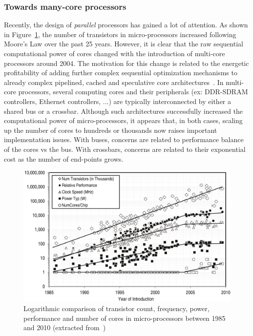 \documentclass[main.tex]{subfiles}
\begin{document}
\subsubsection{Towards many-core processors}
Recently, the design of \emph{parallel} processors has gained a lot of
attention. As shown in Figure~\ref{fig_intro_procPerfScaling}, the number of
transistors in micro-processors increased following Moore's Law over the past
25 years. However, it is clear that the raw sequential computational power of
cores changed with the introduction of multi-core processors around 2004. The
motivation for this change is related to the energetic profitability of adding
further complex sequential optimization mechanisms to already complex
pipelined, cached and speculative core architectures~\cite{Borkar2011}. In
multi-core processors, several computing cores and their peripherals (ex:
DDR-SDRAM controllers, Ethernet controllers, ...) are typically interconnected
by either a shared bus or a crossbar. Although such architectures successfully
increased the computational power of micro-processors, it appears that, in both
cases, scaling up the number of cores to hundreds or thousands now raises
important implementation issues. With buses, concerns are related to
performance balance of the cores vs the bus. With crossbars, concerns are
related to their exponential cost as the number of end-points grows.

\begin{figure}
    \centering
    \includegraphics[width=14cm]{imgs/png/intro_procPerfScaling.png}
    \caption{Logarithmic comparison of transistor count, frequency, power,
    performance and number of cores in micro-processors between 1985 and 2010
    (extracted from~\cite{Fuller2011})}
    \label{fig_intro_procPerfScaling}
\end{figure}
\end{document}
